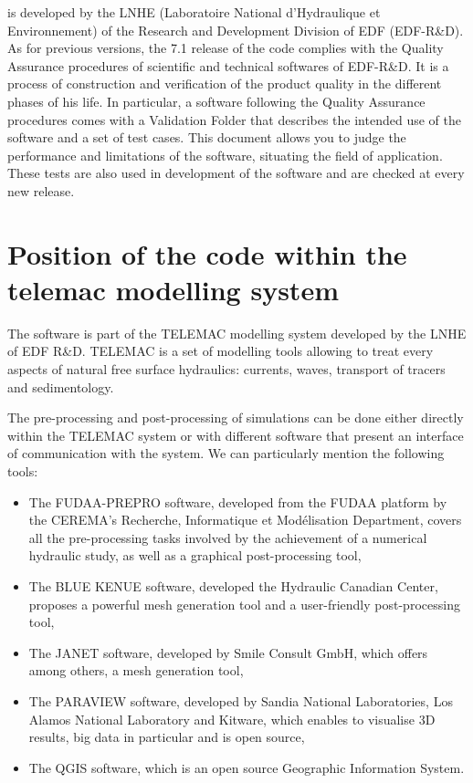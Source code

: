  is developed by the LNHE (Laboratoire National d'Hydraulique et
Environnement) of the Research and Development Division of EDF (EDF-R\&D). As
for previous versions, the 7.1 release of the code complies with the Quality
Assurance procedures of scientific and technical softwares of EDF-R\&D. It is a
process of construction and verification of the product quality in the
different phases of his life. In particular, a software following the Quality
Assurance procedures comes with a Validation Folder that describes the intended
use of the software and a set of test cases. This document allows you to judge
the performance and limitations of the software, situating the field of
application. These tests are also used in development of the software and are
checked at every new release.

\section{Position of the  code within the telemac modelling system}

The  software is part of the TELEMAC modelling system developed by
the LNHE of EDF R\&D. TELEMAC is a set of modelling tools allowing to treat
every aspects of natural free surface hydraulics: currents, waves, transport of
tracers and sedimentology.

The pre-processing and post-processing of simulations can be done either
directly within the TELEMAC system or with different software that present an
interface of communication with the system. We can particularly mention the
following tools:

\begin{itemize}
\item The FUDAA-PREPRO software, developed from the FUDAA platform
by the CEREMA's Recherche, Informatique et Modélisation Department, covers all
the pre-processing tasks involved by the achievement of a numerical hydraulic
study, as well as a graphical post-processing tool,
\item The BLUE KENUE software, developed the Hydraulic Canadian
Center, proposes a powerful mesh generation tool and a user-friendly
post-processing tool,
\item The JANET software, developed by Smile Consult GmbH, which offers among
others, a mesh generation tool,
\item The PARAVIEW software, developed by Sandia National Laboratories, Los
Alamos National Laboratory and Kitware, which enables to visualise 3D results,
big data in particular and is open source,
\item The QGIS software, which is an open source Geographic Information System.
\end{itemize}


